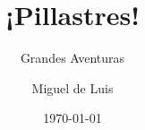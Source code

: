 \title{¡Pillastres!}
\subtitle{Grandes Aventuras}
\subject{Juego de Rol no sólo para niños}
\author{Miguel de Luis}
\publishers{Pequeña Editorial Imaginaria}
\date{\today}